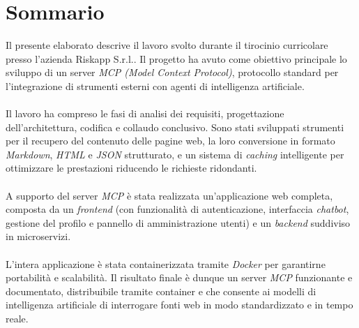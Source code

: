 \cleardoublepage
{}
{}
\begingroup
\let\clearpage\relax
\let\cleardoublepage\relax
\let\cleardoublepage\relax

\chapter*{Sommario}

Il presente elaborato descrive il lavoro svolto durante il tirocinio 
curricolare presso l'azienda Riskapp S.r.l.. 
Il progetto ha avuto come obiettivo principale lo sviluppo di un 
server \textit{MCP (Model Context Protocol)}, protocollo standard per 
l'integrazione di strumenti esterni con agenti di intelligenza artificiale. 
\\\\Il lavoro ha compreso le fasi di analisi dei 
requisiti, progettazione dell'architettura, codifica e collaudo conclusivo.
Sono stati sviluppati strumenti per il 
recupero del contenuto delle pagine web, la loro conversione in formato 
\textit{Markdown}, \textit{HTML} e \textit{JSON} strutturato, e un sistema di \textit{caching} intelligente per 
ottimizzare le prestazioni riducendo le richieste ridondanti. 
\\\\A supporto del server \textit{MCP} è stata realizzata un'applicazione web completa, 
composta da un \textit{frontend} (con funzionalità di autenticazione, interfaccia 
\textit{chatbot}, gestione del profilo e pannello di amministrazione utenti) e un 
\textit{backend} suddiviso in microservizi.
\\\\L'intera applicazione è stata containerizzata tramite \textit{Docker} per garantirne 
portabilità e scalabilità. Il risultato finale è dunque un server \textit{MCP} 
funzionante e documentato, distribuibile tramite container e che 
consente ai modelli di intelligenza artificiale di interrogare fonti 
web in modo standardizzato e in tempo reale.




\endgroup

\vfill
